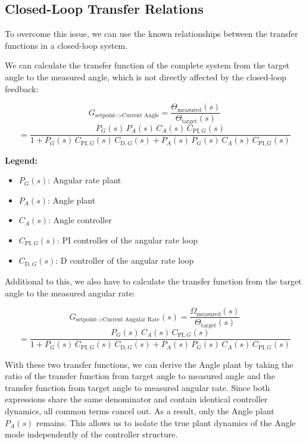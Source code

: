 \documentclass[a4paper,11pt,bibliography=totoc,listof=totoc]{scrreprt}
\begin{document}
\subsection{Closed-Loop Transfer Relations}

To overcome this issue, we can use the known relationships between the transfer functions in a closed-loop system. 

We can calculate the transfer function of the complete system from the target angle to the measured angle, which is not directly affected by the closed-loop feedback:

\begin{equation}
G_{\text{setpoint->Current Angle}}= \frac{\Theta_{\text{measured}}(s)}{\Theta_{\text{target}}(s)}
\end{equation}
\begin{equation}
= \frac{
P_G(s)\,
P_A(s)\,
C_A(s)\,
C_{\text{PI},G}(s)
}{
1
+ P_G(s)\,
C_{\text{PI},G}(s)\,
C_{\text{D},G}(s)
+ P_A(s)\,
P_G(s)\,
C_A(s)\,
C_{\text{PI},G}(s)
}
\end{equation}

\noindent
\textbf{Legend:}
\begin{itemize}
    \item $P_G(s)$: Angular rate plant
    \item $P_A(s)$: Angle plant
    \item $C_A(s)$: Angle controller
    \item $C_{\text{PI},G}(s)$: PI controller of the angular rate loop
    \item $C_{\text{D},G}(s)$: D controller of the angular rate loop
\end{itemize}
\par

Additional to this, we also have to calculate the transfer function from the target angle to the measured angular rate:

\begin{equation}
G_{\text{setpoint->Current Angular Rate}}(s) = \frac{\Omega_{\text{measured}}(s)}{\Theta_{\text{target}}(s)} 
\end{equation}
\begin{equation}
= \frac{
P_G(s)\,
C_A(s)\,
C_{\text{PI},G}(s)
}{
1
+ P_G(s)\,
C_{\text{PI},G}(s)\,
C_{\text{D},G}(s)
+ P_A(s)\,
P_G(s)\,
C_A(s)\,
C_{\text{PI},G}(s)
}
\end{equation}

With these two transfer functions, we can derive the Angle plant by taking the ratio of the transfer function from target angle to measured angle and the transfer function from target angle to measured angular rate.
Since both expressions share the same denominator and contain identical controller dynamics, all common terms cancel out. As a result, only the Angle plant $P_A(s)$ remains. This allows us to isolate the true plant dynamics of the Angle mode independently of the controller structure.
\end{document}
